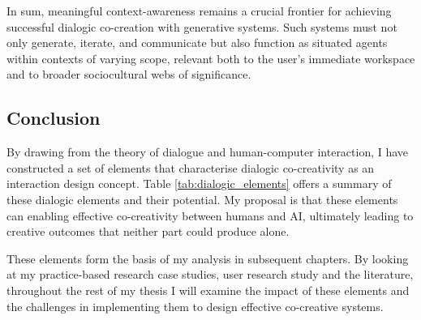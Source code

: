 In sum, meaningful context-awareness remains a crucial frontier for achieving successful dialogic co-creation with generative systems. Such systems must not only generate, iterate, and communicate but also function as situated agents within contexts of varying scope, relevant both to the user's immediate workspace and to broader sociocultural webs of significance.

\subsection{Conclusion}

By drawing from the theory of dialogue and human-computer interaction, I have constructed a set of elements that characterise dialogic co-creativity as an interaction design concept. Table \ref{tab:dialogic_elements} offers a summary of these dialogic elements and their potential.  My proposal is that these elements can enabling effective co-creativity between humans and AI, ultimately leading to creative outcomes that neither part could produce alone. 

These elements form the basis of my analysis in subsequent chapters. By looking at my practice-based research case studies, user research study and the literature, throughout the rest of my thesis I will examine the impact of these elements and the challenges in implementing them to design effective co-creative systems.  

